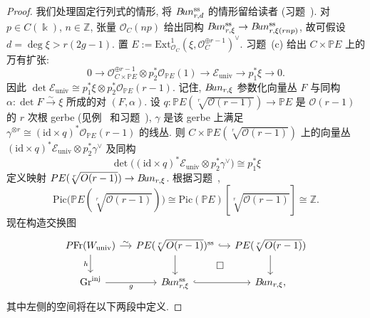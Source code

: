 \begin{proof}
我们处理固定行列式的情形, 将 $B\!un_{r,d}^{\mathrm{ss}}$ 的情形留给读者 (习题~). 对 $p\in C(\Bbbk)$, $n\in\mathbb Z$, 张量 $\mathcal O_C(np)$ 给出同构 $B\!un_{r,\xi}^{\mathrm{ss}}\to B\!un_{r,\xi(rnp)}^{\mathrm{ss}}$, 故可假设 $d=\deg\xi>r(2g-1)$. 置 $E:=\mathrm{Ext}^1_{\mathcal O_C}(\xi,\mathcal O_C^{\oplus r-1})^\vee$. 习题~(c) 给出 $C\times\mathbb PE$ 上的万有扩张:
\begin{equation}\label{src:9.4.38}
0\longrightarrow\mathcal O_{C\times\mathbb PE}^{\oplus r-1}\otimes p_2^*\mathcal O_{\mathbb PE}(1)\longrightarrow\mathcal E_{\mathrm{univ}}\longrightarrow p_1^*\xi\longrightarrow0.
\end{equation}
因此 $\det\mathcal E_{\mathrm{univ}}\cong p_1^*\xi\otimes p_2^*\mathcal O_{\mathbb PE}(r-1)$. 记住, $B\!un_{r,\xi}$ 参数化向量丛 $F$ 与同构 $\alpha:\det F\xrightarrow{\sim}\xi$ 所成的对 $(F,\alpha)$. 设 $q:\mathbb PE(\sqrt[r]{\mathcal O(r-1)})\to\mathbb PE$ 是 $\mathcal O(r-1)$ 的 $r$ 次根 gerbe (见例~ 和习题~), $\gamma$ 是该 gerbe 上满足 $\gamma^{\otimes r}\cong(\mathrm{id}\times q)^*\mathcal O_{\mathbb PE}(r-1)$ 的线丛. 则 $C\times\mathbb PE(\sqrt[r]{\mathcal O(r-1)})$ 上的向量丛 $(\mathrm{id}\times q)^*\mathcal E_{\mathrm{univ}}\otimes p_2^*\gamma^\vee$ 及同构
\[
\det\big((\mathrm{id}\times q)^*\mathcal E_{\mathrm{univ}}\otimes p_2^*\gamma^\vee\big)\cong p_1^*\xi
\]
定义映射 $PE(\sqrt[r]{O(r-1)})\to B\!un_{r,\xi}$. 根据习题~,
\[
\mathrm{Pic}\big(\mathbb PE(\sqrt[r]{\mathcal O(r-1)})\big)\cong\mathrm{Pic}(\mathbb PE)[\sqrt[r]{\mathcal O(r-1)}]\cong\mathbb Z.
\]
现在构造交换图
\[
\begin{tikzcd}[ampersand replacement=\&,column sep=small]
\mathbb P\mathrm{Fr}(W_{\mathrm{univ}})\arrow[r,"\sim"]\arrow[d,"h"']\&\mathbb PE(\sqrt[r]{\mathcal O(r-1)})^{\mathrm{ss}}\arrow[r,hook]\arrow[d]\&\mathbb PE(\sqrt[r]{\mathcal O(r-1)})\arrow[d]\\
\Gr^{\mathrm{inj}}\arrow[r,"g"']\&\cBun_{r,\xi}^{\mathrm{ss}}\arrow[r,hook]\arrow[ur,phantom,"\square"]\&\cBun_{r,\xi},
\end{tikzcd}
\]
其中左侧的空间将在以下两段中定义.


\end{proof}
